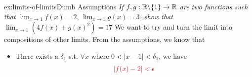 \documentclass[landscape, 8pt]{extarticle}
\begin{document}
\begin{multicols}{3}
\begin{xmp}{ex:limits-of-limits}{Dumb Assumptions}
    \textit{If $f,g:\mathbb{R}\backslash\{1\}\to \mathbb{R}$ are two functions such that $\lim_{x\to 1} f(x)=2,\, \lim_{x\to 1} g(x)=3$, show that $\lim_{x\to 1} (4f(x)+g(x)^{2}) = 17$}
    We want to try and turn the limit into compositions of other limits. From the assumptions, we know that
    \renewcommand\labelitemi{\tiny$\bullet$}
    \begin{itemize}
        \setlength\itemsep{0em}
        \item There exists a $\delta_{1}$ s.t. $\forall x$ where $0<\lvert x-1\rvert < \delta_{1}$, we have
        \begin{align}{\color{colour1}
            \lvert f(x) - 2\rvert < \epsilon \label{align:fx}
        }\end{align}
        

\end{itemize}
\end{xmp}
\end{multicols}
\end{document}
